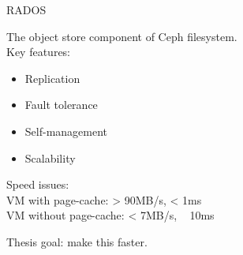 \begin{frame}{RADOS}

	The object store component of Ceph filesystem.\\
	\spc
	Key features:
	\begin{itemize}
		\item Replication
		\item Fault tolerance
		\item Self-management
		\item Scalability
	\end{itemize}


	\pause

	\spc
	Speed issues:\\
	VM with page-cache: > 90MB/s, < 1ms\\
	VM without page-cache: < 7MB/s, ~ 10ms

	\pause

	\spc
	Thesis goal: make this faster.

\end{frame}


